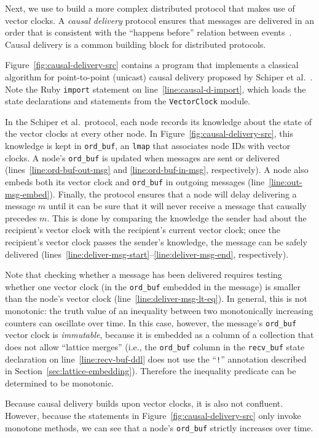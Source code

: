 Next, we use \lang to build a more complex distributed protocol that makes use
of vector clocks. A \emph{causal delivery} protocol ensures that messages are
delivered in an order that is consistent with the ``happens before'' relation
between events~\cite{Lamport1978}. Causal delivery is a common
building block for distributed protocols.

Figure~\ref{fig:causal-delivery-src} contains a \lang program that implements a
classical algorithm for point-to-point (unicast) causal delivery proposed by
Schiper et al.~\cite{Schiper1989}. Note the Ruby \texttt{import} statement on
line~\ref{line:causal-d-import}, which loads the \lang state declarations and
statements from the \texttt{VectorClock} module.

In the Schiper et al.\ protocol, each node records its knowledge about the state
of the vector clocks at every other node. In
Figure~\ref{fig:causal-delivery-src}, this knowledge is kept in
\texttt{ord\_buf}, an \texttt{lmap} that associates node IDs with vector
clocks. A node's \texttt{ord\_buf} is updated when messages are sent or
delivered (lines~\ref{line:ord-buf-out-msg} and \ref{line:ord-buf-in-msg},
respectively). A node also embeds both its vector clock and \texttt{ord\_buf} in
outgoing messages (line~\ref{line:out-msg-embed}). Finally, the protocol ensures
that a node will delay delivering a message $m$ until it can be sure that it
will never receive a message that causally precedes $m$. This is done by
comparing the knowledge the sender had about the recipient's vector clock with
the recipient's current vector clock; once the recipient's vector clock passes
the sender's knowledge, the message can be safely delivered
(lines~\ref{line:deliver-msg-start}--\ref{line:deliver-msg-end}, respectively).

Note that checking whether a message has been delivered requires testing whether
one vector clock (in the \texttt{ord\_buf} embedded in the message) is smaller
than the node's vector clock (line~\ref{line:deliver-msg-lt-eq}). In general,
this is not monotonic: the truth value of an inequality between two
monotonically increasing counters can oscillate over time.  In this case,
however, the message's \texttt{ord\_buf} vector clock is \emph{immutable},
because it is embedded as a column of a collection that does not allow ``lattice
merges'' (i.e., the \texttt{ord\_buf} column in the \texttt{recv\_buf} state
declaration on line~\ref{line:recv-buf-ddl} does not use the ``\texttt{!}''
annotation described in Section~\ref{sec:lattice-embedding}). Therefore the
inequality predicate can be determined to be monotonic.

Because causal delivery builds upon vector clocks, it is also not
confluent. However, because the statements in
Figure~\ref{fig:causal-delivery-src} only invoke monotone methods, we can see
that a node's \texttt{ord\_buf} strictly increases over time.
